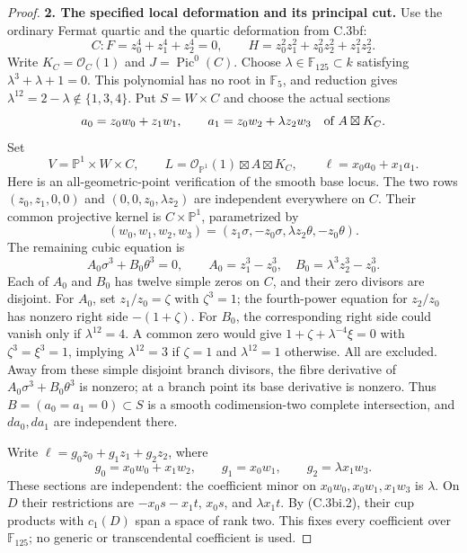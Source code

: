 \begin{proof}
\textbf{2. The specified local deformation and its principal cut.}
Use the ordinary Fermat quartic and the quartic deformation from C.3bf:
\[
 C: F=z_0^4+z_1^4+z_2^4=0,\qquad
 H=z_0^2z_1^2+z_0^2z_2^2+z_1^2z_2^2.
\]
Write $K_C=\mathcal O_C(1)$ and $J=\operatorname{Pic}^0(C)$.
Choose $\lambda\in\mathbb F_{125}\subset k$ satisfying
$\lambda^3+\lambda+1=0$. This polynomial has no root in $\mathbb F_5$,
and reduction gives $\lambda^{12}=2-\lambda\notin\{1,3,4\}$.
Put $S=W\times C$ and choose the actual sections
\[
 a_0=z_0w_0+z_1w_1,\qquad a_1=z_0w_2+\lambda z_2w_3
 \quad\hbox{of }A\boxtimes K_C.
\]
Set
\[
 V=\mathbb P^1\times W\times C,\qquad
 L=\mathcal O_{\mathbb P^1}(1)\boxtimes A\boxtimes K_C,
 \qquad\ell=x_0a_0+x_1a_1.
 \tag{C.3bi.3}
\]
Here is an all-geometric-point verification of the smooth base locus.
The two rows $(z_0,z_1,0,0)$ and $(0,0,z_0,\lambda z_2)$ are
independent everywhere on $C$. Their common projective kernel is
$C\times\mathbb P^1$, parametrized by
\[
 (w_0,w_1,w_2,w_3)=(z_1\sigma,-z_0\sigma,
                      \lambda z_2\theta,-z_0\theta).
\]
The remaining cubic equation is
\[
 A_0\sigma^3+B_0\theta^3=0,\qquad
 A_0=z_1^3-z_0^3,\quad B_0=\lambda^3z_2^3-z_0^3.
\]
Each of $A_0$ and $B_0$ has twelve simple zeros on $C$, and their
zero divisors are disjoint. For $A_0$, set $z_1/z_0=\zeta$ with
$\zeta^3=1$; the fourth-power equation for $z_2/z_0$ has nonzero
right side $-(1+\zeta)$. For $B_0$, the corresponding right side
could vanish only if $\lambda^{12}=4$. A common zero would give
$1+\zeta+\lambda^{-4}\xi=0$ with $\zeta^3=\xi^3=1$, implying
$\lambda^{12}=3$ if $\zeta=1$ and $\lambda^{12}=1$ otherwise.
All are excluded. Away from these simple disjoint branch divisors,
the fibre derivative of $A_0\sigma^3+B_0\theta^3$ is nonzero;
at a branch point its base derivative is nonzero. Thus
$B=(a_0=a_1=0)\subset S$ is a smooth codimension-two complete
intersection, and $da_0,da_1$ are independent there.

Write $\ell=g_0z_0+g_1z_1+g_2z_2$, where
\[
 g_0=x_0w_0+x_1w_2,\qquad g_1=x_0w_1,\qquad
 g_2=\lambda x_1w_3.
 \tag{C.3bi.4}
\]
These sections are independent: the coefficient minor on
$x_0w_0,x_0w_1,x_1w_3$ is $\lambda$.
On $D$ their restrictions are $-x_0s-x_1t$, $x_0s$, and
$\lambda x_1t$. By (C.3bi.2), their cup products with $c_1(D)$
span a space of rank two. This fixes every coefficient over
$\mathbb F_{125}$; no generic or transcendental coefficient is used.


\end{proof}
